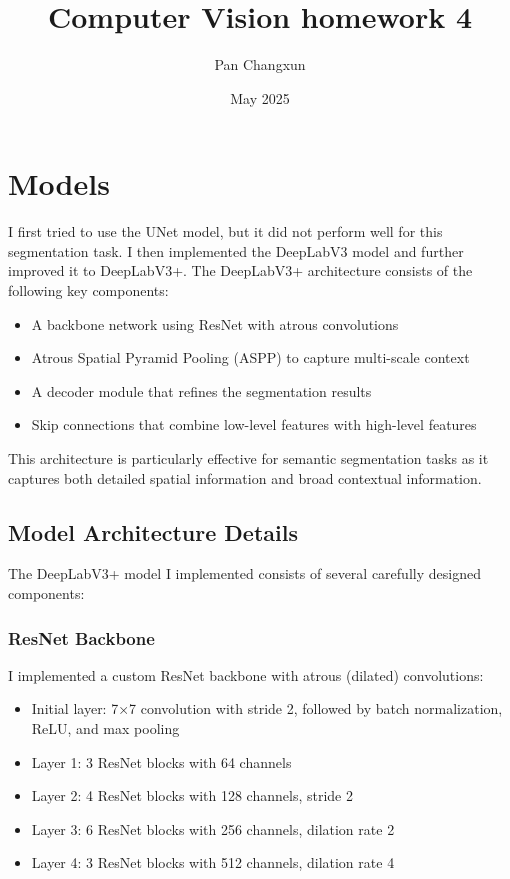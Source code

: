 \documentclass[]{article}
\title{\textbf{Computer Vision homework 4}}
\author{Pan Changxun}
\date{May 2025}
\begin{document}
\maketitle

\section{Models}
I first tried to use the UNet model, but it did not perform well for this segmentation task. I then implemented the DeepLabV3 model and further improved it to DeepLabV3+. The DeepLabV3+ architecture consists of the following key components:

\begin{itemize}
    \item A backbone network using ResNet with atrous convolutions
    \item Atrous Spatial Pyramid Pooling (ASPP) to capture multi-scale context
    \item A decoder module that refines the segmentation results
    \item Skip connections that combine low-level features with high-level features
\end{itemize}

This architecture is particularly effective for semantic segmentation tasks as it captures both detailed spatial information and broad contextual information.

\subsection{Model Architecture Details}
The DeepLabV3+ model I implemented consists of several carefully designed components:

\subsubsection{ResNet Backbone}
I implemented a custom ResNet backbone with atrous (dilated) convolutions:
\begin{itemize}
    \item Initial layer: 7×7 convolution with stride 2, followed by batch normalization, ReLU, and max pooling
    \item Layer 1: 3 ResNet blocks with 64 channels
    \item Layer 2: 4 ResNet blocks with 128 channels, stride 2
    \item Layer 3: 6 ResNet blocks with 256 channels, dilation rate 2
    \item Layer 4: 3 ResNet blocks with 512 channels, dilation rate 4
\end{itemize}
\end{document}
